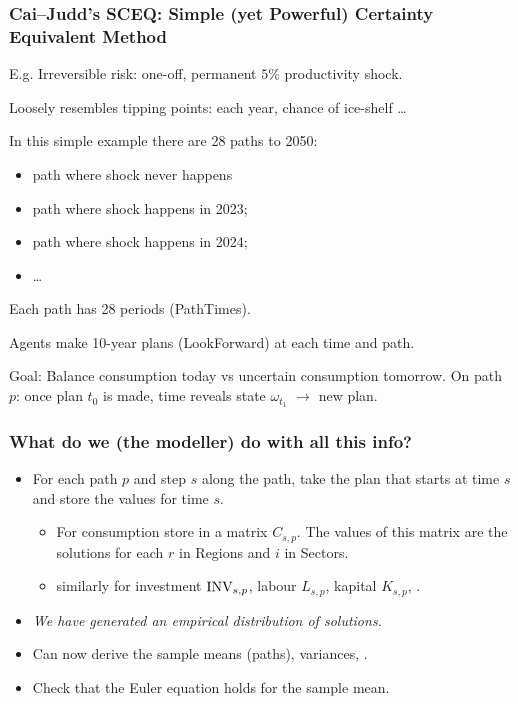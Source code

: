 \documentclass[handout,english]{beamer}
\begin{document}
\begin{frame}
  \frametitle{Cai--Judd's SCEQ: \small Simple (yet Powerful) Certainty
  Equivalent Method}
  E.g. Irreversible risk:  one-off, permanent $5\%$ productivity shock.

  Loosely resembles tipping points: each year, chance of ice-shelf \dots

  In this simple example there are 28 paths to 2050:
    \begin{itemize}\small
    \item path where shock never happens
    \item path where shock happens in 2023;
    \item path where shock happens in 2024;
    \item \dots
    \end{itemize}\normalsize
  Each path has 28 periods (PathTimes).

  Agents make 10-year plans (LookForward) at each time and path.
  
  \small
  Goal: Balance consumption today vs uncertain consumption tomorrow.
  On path $p$: once plan $t_0$ is made, time reveals state $\omega_{t_{1}}$
 $\rightarrow$ new plan.

\end{frame}
\begin{frame}
  \frametitle{What do we (the modeller) do with all this info?}
  \begin{itemize}
    
    \item For each path $p$ and step $s$ along the path, take the plan that
      starts at time $s$ and store the values for time $s$.
    \begin{itemize}
      \item For consumption store in a matrix $C_{s, p}$. The values of this
        matrix are the solutions for each $r$ in Regions and $i$ in Sectors.

      \item similarly for investment $\textup{INV}_{s, p}$, labour $L_{s, p}$,
        kapital $K_{s, p}$, \etc.
    \end{itemize}
    \item \emph{We have generated an empirical distribution of solutions.}

    \item Can now derive the sample means (paths), variances, \etc.

    \item Check that the Euler equation holds for the sample mean.

  \end{itemize}
\end{frame}
\end{document}
